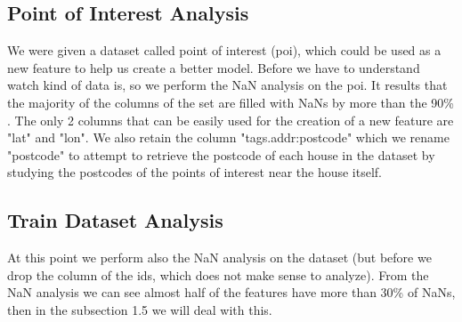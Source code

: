 \documentclass[10pt, notitlepage]{article}
\begin{document}
\color{blue}
\subsection{Point of Interest Analysis}
\color{black}
We were given a dataset called point of interest (poi), which could be used as a new feature to help us create a better model. Before we have to understand watch kind of data is, so we perform the NaN analysis on the poi. It results that the majority of the columns of the set are filled with NaNs by more than the 90\% . The only 2 columns that can be easily used for the creation of a new feature are "lat" and "lon". We also retain the column "tags.addr:postcode" which we rename "postcode" to attempt to retrieve the postcode of each house in the dataset by studying the postcodes of the points of interest near the house itself.

\color{blue}
\subsection{Train Dataset Analysis}
\color{black}
At this point we perform also the NaN analysis on the dataset (but before we drop the column of the ids, which does not make sense to analyze). From the NaN analysis we can see almost half of the features have more than 30\% of NaNs, then in the subsection 1.5 we will deal with this. 

\color{blue}
\end{document}
